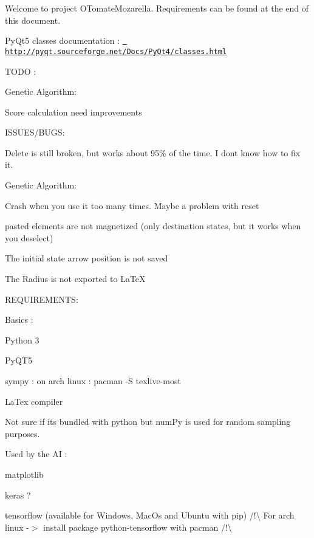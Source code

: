 Welcome to project O\+Tomate\+Mozarella. Requirements can be found at the end of this document.

Py\+Qt5 classes documentation \+: \href{http://pyqt.sourceforge.net/Docs/PyQt4/classes.html}{\texttt{ http\+://pyqt.\+sourceforge.\+net/\+Docs/\+Py\+Qt4/classes.\+html}}

T\+O\+DO \+:
\begin{DoxyItemize}
\item Genetic Algorithm\+:
\begin{DoxyItemize}
\item Score calculation need improvements
\end{DoxyItemize}
\end{DoxyItemize}

I\+S\+S\+U\+E\+S/\+B\+U\+GS\+:
\begin{DoxyItemize}
\item Delete is still broken, but works about 95\% of the time. I don\textquotesingle{}t know how to fix it.
\item Genetic Algorithm\+:
\begin{DoxyItemize}
\item Crash when you use it too many times. Maybe a problem with reset
\end{DoxyItemize}
\item pasted elements are not magnetized (only destination states, but it works when you deselect)
\item The initial state arrow position is not saved
\item The Radius is not exported to La\+TeX
\end{DoxyItemize}

R\+E\+Q\+U\+I\+R\+E\+M\+E\+N\+TS\+:


\begin{DoxyItemize}
\item Basics \+:
\begin{DoxyItemize}
\item Python 3
\item Py\+Q\+T5
\item sympy \+: on arch linux \+: pacman -\/S texlive-\/most
\item La\+Tex compiler
\item Not sure if it\textquotesingle{}s bundled with python but num\+Py is used for random sampling purposes.
\end{DoxyItemize}
\item Used by the AI \+:
\begin{DoxyItemize}
\item matplotlib
\item keras ?
\item tensorflow (available for Windows, Mac\+Os and Ubuntu with pip) /!\textbackslash{} For arch linux -\/$>$ install package python-\/tensorflow with pacman /!\textbackslash{} 
\end{DoxyItemize}
\end{DoxyItemize}